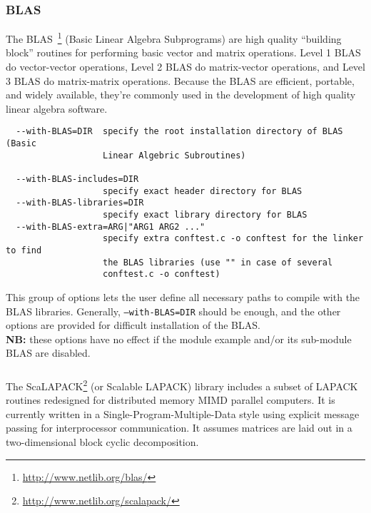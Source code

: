 \subsubsection{BLAS}
The BLAS~\footnote{\url{http://www.netlib.org/blas/}} (Basic Linear
Algebra Subprograms) are high quality ``building block'' routines for
performing basic vector and matrix operations.  Level 1 BLAS do
vector-vector operations, Level 2 BLAS do matrix-vector operations,
and Level 3 BLAS do matrix-matrix operations. Because the BLAS are
efficient, portable, and widely available, they're commonly used in
the development of high quality linear algebra software.

{\footnotesize
\begin{verbatim}
  --with-BLAS=DIR  specify the root installation directory of BLAS (Basic
                   Linear Algebric Subroutines)

  --with-BLAS-includes=DIR
                   specify exact header directory for BLAS
  --with-BLAS-libraries=DIR
                   specify exact library directory for BLAS
  --with-BLAS-extra=ARG|"ARG1 ARG2 ..."
                   specify extra conftest.c -o conftest for the linker to find
                   the BLAS libraries (use "" in case of several 
                   conftest.c -o conftest)
\end{verbatim}
}
\noindent This group of options lets the user define all necessary
paths to compile with the BLAS libraries. Generally,
\texttt{--with-BLAS=DIR} should be enough, and the other options are
provided for difficult installation of the BLAS.\\ \textbf{NB:} these
options have no effect if the module example and/or its sub-module
BLAS are disabled.

\subsubsection{\scalapack}

The ScaLAPACK\footnote{\url{http://www.netlib.org/scalapack/}} (or
Scalable LAPACK) library includes a subset of LAPACK routines
redesigned for distributed memory MIMD parallel computers. It is
currently written in a Single-Program-Multiple-Data style using
explicit message passing for interprocessor communication. It assumes
matrices are laid out in a two-dimensional block cyclic decomposition.

